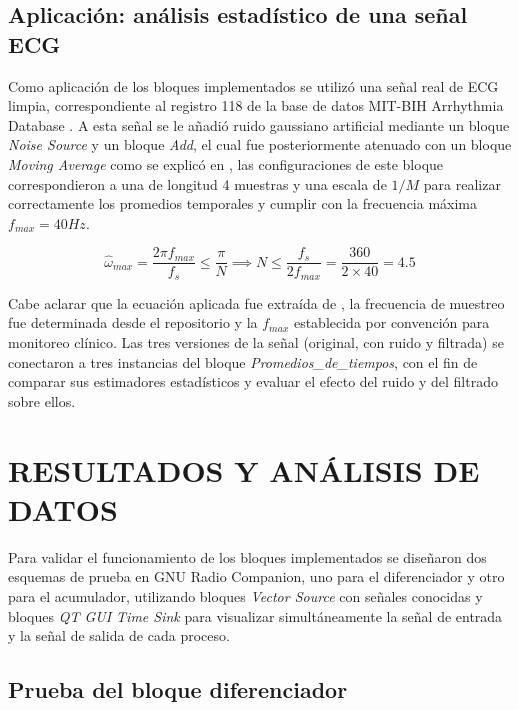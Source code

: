 \documentclass[twocolumn]{IEEEtran}
\begin{document}
\subsection{Aplicación: análisis estadístico de una señal ECG}

Como aplicación de los bloques implementados se utilizó una señal real de ECG 
limpia, correspondiente al registro 118 de la base de datos MIT-BIH Arrhythmia 
Database \cite{moody2005mitdb}. A esta señal se le añadió ruido gaussiano 
artificial mediante un bloque \textit{Noise Source} y un bloque \textit{Add}, el 
cual fue posteriormente atenuado con un bloque \textit{Moving Average} como se explicó en \cite{tijaro2025timeaverages}, las configuraciones de este bloque correspondieron a una de longitud 
4 muestras y una escala de $1/M$ para realizar correctamente los promedios temporales y cumplir con la frecuencia máxima $f_{max}=40Hz$.


\begin{equation}
    \hat{\omega}_{max} = \frac{2\pi f_{max}}{f_s} \leq \frac{\pi}{N} \implies N \leq \frac{f_s}{2 f_{max}} = \frac{360}{2 \times 40} = 4.5
\end{equation}

Cabe aclarar que la ecuación aplicada fue extraída de \cite{wavewalkerdsp2022ma}, la frecuencia de muestreo fue determinada desde el repositorio y la $f_{max}$ establecida por convención para monitoreo clínico. Las tres versiones de la señal (original, con ruido y filtrada) se 
conectaron a tres instancias del bloque \textit{Promedios\_de\_tiempos}, con el fin 
de comparar sus estimadores estadísticos y evaluar el efecto del ruido y del 
filtrado sobre ellos.



\section{RESULTADOS Y ANÁLISIS DE DATOS}

Para validar el funcionamiento de los bloques implementados se diseñaron dos 
esquemas de prueba en GNU Radio Companion, uno para el diferenciador y otro para 
el acumulador, utilizando bloques \textit{Vector Source} con señales conocidas y 
bloques \textit{QT GUI Time Sink} para visualizar simultáneamente la señal de 
entrada y la señal de salida de cada proceso.

\subsection{Prueba del bloque diferenciador}
\end{document}
